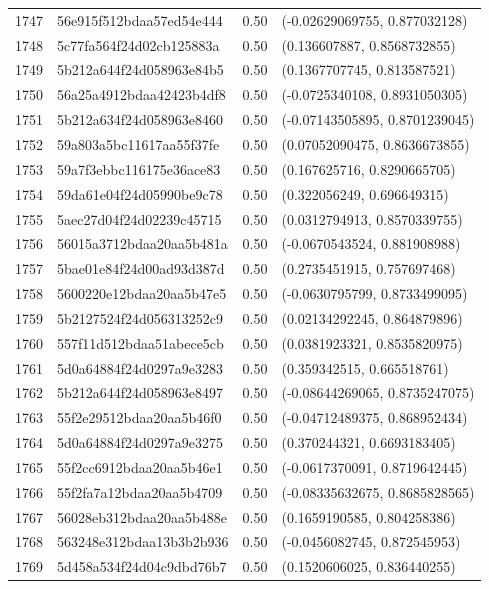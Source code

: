 \begin{table}[ht]
\begin{tabular}{rlrl}
  1747 & 56e915f512bdaa57ed54e444 & 0.50 & (-0.02629069755, 0.877032128) \\ 
  1748 & 5c77fa564f24d02cb125883a & 0.50 & (0.136607887, 0.8568732855) \\ 
  1749 & 5b212a644f24d058963e84b5 & 0.50 & (0.1367707745, 0.813587521) \\ 
  1750 & 56a25a4912bdaa42423b4df8 & 0.50 & (-0.0725340108, 0.8931050305) \\ 
  1751 & 5b212a634f24d058963e8460 & 0.50 & (-0.07143505895, 0.8701239045) \\ 
  1752 & 59a803a5bc11617aa55f37fe & 0.50 & (0.07052090475, 0.8636673855) \\ 
  1753 & 59a7f3ebbc116175e36ace83 & 0.50 & (0.167625716, 0.8290665705) \\ 
  1754 & 59da61e04f24d05990be9c78 & 0.50 & (0.322056249, 0.696649315) \\ 
  1755 & 5aec27d04f24d02239c45715 & 0.50 & (0.0312794913, 0.8570339755) \\ 
  1756 & 56015a3712bdaa20aa5b481a & 0.50 & (-0.0670543524, 0.881908988) \\ 
  1757 & 5bae01e84f24d00ad93d387d & 0.50 & (0.2735451915, 0.757697468) \\ 
  1758 & 5600220e12bdaa20aa5b47e5 & 0.50 & (-0.0630795799, 0.8733499095) \\ 
  1759 & 5b2127524f24d056313252c9 & 0.50 & (0.02134292245, 0.864879896) \\ 
  1760 & 557f11d512bdaa51abece5cb & 0.50 & (0.0381923321, 0.8535820975) \\ 
  1761 & 5d0a64884f24d0297a9e3283 & 0.50 & (0.359342515, 0.665518761) \\ 
  1762 & 5b212a644f24d058963e8497 & 0.50 & (-0.08644269065, 0.8735247075) \\ 
  1763 & 55f2e29512bdaa20aa5b46f0 & 0.50 & (-0.04712489375, 0.868952434) \\ 
  1764 & 5d0a64884f24d0297a9e3275 & 0.50 & (0.370244321, 0.6693183405) \\ 
  1765 & 55f2cc6912bdaa20aa5b46e1 & 0.50 & (-0.0617370091, 0.8719642445) \\ 
  1766 & 55f2fa7a12bdaa20aa5b4709 & 0.50 & (-0.08335632675, 0.8685828565) \\ 
  1767 & 56028eb312bdaa20aa5b488e & 0.50 & (0.1659190585, 0.804258386) \\ 
  1768 & 563248e312bdaa13b3b2b936 & 0.50 & (-0.0456082745, 0.872545953) \\ 
  1769 & 5d458a534f24d04c9dbd76b7 & 0.50 & (0.1520606025, 0.836440255) \\ 

\end{tabular}
\end{table}
